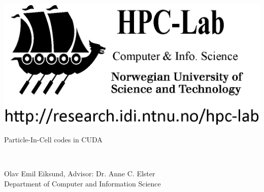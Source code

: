 \documentclass[10pt,a4paper,twocolumns]{article}
\begin{document}
	\begin{minipage}{0.2\textwidth}
		\includegraphics[width=\textwidth]{hpc-lab-no-ntnu-logo}
	\end{minipage}
	\begin{minipage}{0.75\textwidth}
		\begin{center}
		{\huge Particle-In-Cell codes in CUDA}
		\end{center}
	\end{minipage}\\[0.5cm]

	\begin{center}
		Olav Emil Eiksund, Advisor: Dr. Anne C. Elster \\
		Department of Computer and Information Science
	\end{center}
\end{document}

